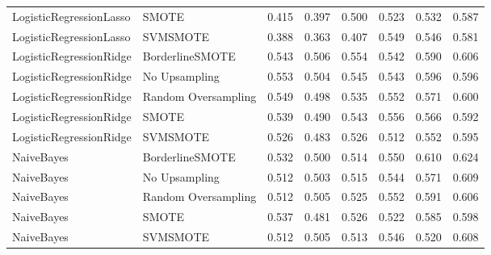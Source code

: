 \begin{tabular}{llllllll}
     LogisticRegressionLasso &               SMOTE & 0.415 &                     0.397 &                 0.500 &                  0.523 &                                   0.532 &     0.587 \\
     LogisticRegressionLasso &            SVMSMOTE & 0.388 &                     0.363 &                 0.407 &                  0.549 &                                   0.546 &     0.581 \\
     LogisticRegressionRidge &     BorderlineSMOTE & 0.543 &                     0.506 &                 0.554 &                  0.542 &                                   0.590 &     0.606 \\
     LogisticRegressionRidge &       No Upsampling & 0.553 &                     0.504 &                 0.545 &                  0.543 &                                   0.596 &     0.596 \\
     LogisticRegressionRidge & Random Oversampling & 0.549 &                     0.498 &                 0.535 &                  0.552 &                                   0.571 &     0.600 \\
     LogisticRegressionRidge &               SMOTE & 0.539 &                     0.490 &                 0.543 &                  0.556 &                                   0.566 &     0.592 \\
     LogisticRegressionRidge &            SVMSMOTE & 0.526 &                     0.483 &                 0.526 &                  0.512 &                                   0.552 &     0.595 \\
                  NaiveBayes &     BorderlineSMOTE & 0.532 &                     0.500 &                 0.514 &                  0.550 &                                   0.610 &     0.624 \\
                  NaiveBayes &       No Upsampling & 0.512 &                     0.503 &                 0.515 &                  0.544 &                                   0.571 &     0.609 \\
                  NaiveBayes & Random Oversampling & 0.512 &                     0.505 &                 0.525 &                  0.552 &                                   0.591 &     0.606 \\
                  NaiveBayes &               SMOTE & 0.537 &                     0.481 &                 0.526 &                  0.522 &                                   0.585 &     0.598 \\
                  NaiveBayes &            SVMSMOTE & 0.512 &                     0.505 &                 0.513 &                  0.546 &                                   0.520 &     0.608 \\

\end{tabular}

